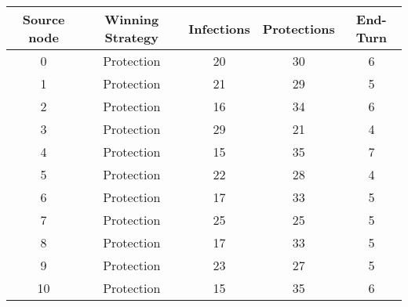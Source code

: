 \documentclass[results.tex]{subfiles}
\begin{document}
    \begin{center}
        \begin{tabular}{| c || c | c | c | c |}
            \hline
            {\bfseries Source node} & {\bfseries Winning Strategy} & {\bfseries Infections} & {\bfseries Protections}
            & {\bfseries End-Turn}
            \\  %
            \hline\hline
            0                       & Protection                   & 20                     & 30                      & 6                    \\
            \hline
            1                       & Protection                   & 21                     & 29                      & 5                    \\
            \hline
            2                       & Protection                   & 16                     & 34                      & 6                    \\
            \hline
            3                       & Protection                   & 29                     & 21                      & 4                    \\
            \hline
            4                       & Protection                   & 15                     & 35                      & 7                    \\
            \hline
            5                       & Protection                   & 22                     & 28                      & 4                    \\
            \hline
            6                       & Protection                   & 17                     & 33                      & 5                    \\
            \hline
            7                       & Protection                   & 25                     & 25                      & 5                    \\
            \hline
            8                       & Protection                   & 17                     & 33                      & 5                    \\
            \hline
            9                       & Protection                   & 23                     & 27                      & 5                    \\
            \hline
            10                      & Protection                   & 15                     & 35                      & 6                    \\

\end{tabular}
\end{center}
\end{document}
